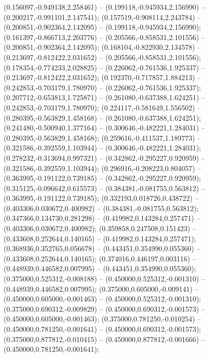  (0.156097,-0.949138,2.258461) -- (0.199118,-0.945934,2.156990) -- (0.200217,-0.991101,2.147541);
 (0.157519,-0.908114,2.243784) -- (0.200851,-0.902364,2.142095) -- (0.199118,-0.945934,2.156990);
 (0.161397,-0.866713,2.203776) -- (0.205566,-0.858531,2.101556) -- (0.200851,-0.902364,2.142095);
 (0.168104,-0.822930,2.134578) -- (0.213697,-0.812422,2.031652) -- (0.205566,-0.858531,2.101556);
 (0.178354,-0.774233,2.028825) -- (0.226062,-0.761536,1.925337) -- (0.213697,-0.812422,2.031652);
 (0.192370,-0.717857,1.884213) -- (0.242853,-0.703179,1.780970) -- (0.226062,-0.761536,1.925337);
 (0.207712,-0.653813,1.725871) -- (0.261080,-0.637388,1.624251) -- (0.242853,-0.703179,1.780970);
 (0.224117,-0.581649,1.556502) -- (0.280395,-0.563829,1.458168) -- (0.261080,-0.637388,1.624251);
 (0.241480,-0.500940,1.377164) -- (0.300646,-0.482221,1.284031) -- (0.280395,-0.563829,1.458168);
 (0.259616,-0.411537,1.189773) -- (0.321586,-0.392559,1.103944) -- (0.300646,-0.482221,1.284031);
 (0.278232,-0.313694,0.997321) -- (0.342862,-0.295227,0.920959) -- (0.321586,-0.392559,1.103944);
 (0.296916,-0.208223,0.804057) -- (0.363995,-0.191122,0.739185) -- (0.342862,-0.295227,0.920959);
 (0.315125,-0.096642,0.615573) -- (0.384381,-0.081755,0.563812) -- (0.363995,-0.191122,0.739185);
 (0.332193,0.018726,0.438722) -- (0.403306,0.030672,0.400982) -- (0.384381,-0.081755,0.563812);
 (0.347366,0.134730,0.281298) -- (0.419982,0.143284,0.257471) -- (0.403306,0.030672,0.400982);
 (0.359858,0.247508,0.151423) -- (0.433608,0.252644,0.140165) -- (0.419982,0.143284,0.257471);
 (0.368936,0.352765,0.056678) -- (0.443451,0.354990,0.055360) -- (0.433608,0.252644,0.140165);
 (0.374016,0.446197,0.003116) -- (0.448939,0.446582,0.007995) -- (0.443451,0.354990,0.055360);
 (0.375000,0.525312,-0.008188) -- (0.450000,0.525312,-0.001310) -- (0.448939,0.446582,0.007995);
 (0.375000,0.605000,-0.009141) -- (0.450000,0.605000,-0.001463) -- (0.450000,0.525312,-0.001310);
 (0.375000,0.690312,-0.009829) -- (0.450000,0.690312,-0.001573) -- (0.450000,0.605000,-0.001463);
 (0.375000,0.781250,-0.010254) -- (0.450000,0.781250,-0.001641) -- (0.450000,0.690312,-0.001573);
 (0.375000,0.877812,-0.010415) -- (0.450000,0.877812,-0.001666) -- (0.450000,0.781250,-0.001641);
